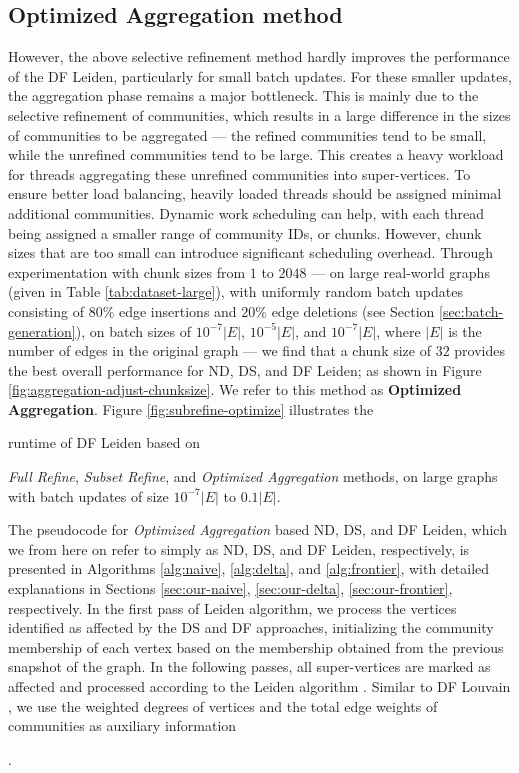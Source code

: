 




\subsection{Optimized Aggregation method}
\label{sec:optimized-aggregation-method}

However, the above selective refinement method hardly improves the performance of the DF Leiden, particularly for small batch updates. For these smaller updates, the aggregation phase remains a major bottleneck. This is mainly due to the selective refinement of communities, which results in a large difference in the sizes of communities to be aggregated --- the refined communities tend to be small, while the unrefined communities tend to be large. This creates a heavy workload for threads aggregating these unrefined communities into super-vertices. To ensure better load balancing, heavily loaded threads should be assigned minimal additional communities. Dynamic work scheduling can help, with each thread being assigned a smaller range of community IDs, or chunks. However, chunk sizes that are too small can introduce significant scheduling overhead. Through experimentation with chunk sizes from $1$ to $2048$ --- on large real-world graphs (given in Table \ref{tab:dataset-large}), with uniformly random batch updates consisting of $80\%$ edge insertions and $20\%$ edge deletions (see Section \ref{sec:batch-generation}), on batch sizes of $10^{-7}|E|$, $10^{-5}|E|$, and $10^{-7}|E|$, where $|E|$ is the number of edges in the original graph --- we find that a chunk size of $32$ provides the best overall performance for ND, DS, and DF Leiden; as shown in Figure \ref{fig:aggregation-adjust-chunksize}. We refer to this method as \textbf{Optimized Aggregation}. Figure \ref{fig:subrefine-optimize} illustrates the runtime of DF Leiden based on \textit{Full Refine}, \textit{Subset Refine}, and \textit{Optimized Aggregation} methods, on large graphs with batch updates of size $10^{-7}|E|$ to $0.1|E|$.




The pseudocode for \textit{Optimized Aggregation} based ND, DS, and DF Leiden, which we from here on refer to simply as ND, DS, and DF Leiden, respectively, is presented in Algorithms \ref{alg:naive}, \ref{alg:delta}, and \ref{alg:frontier}, with detailed explanations in Sections \ref{sec:our-naive}, \ref{sec:our-delta}, \ref{sec:our-frontier}, respectively. In the first pass of Leiden algorithm, we process the vertices identified as affected by the DS and DF approaches, initializing the community membership of each vertex based on the membership obtained from the previous snapshot of the graph. In the following passes, all super-vertices are marked as affected and processed according to the Leiden algorithm \cite{sahu2024shared}. Similar to DF Louvain \cite{sahu2024dflouvain}, we use the weighted degrees of vertices and the total edge weights of communities as auxiliary information \cite{sahu2024dflouvain}.




